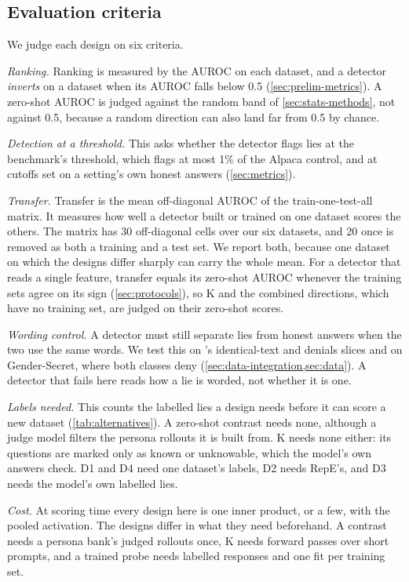 \subsection{Evaluation criteria}
\label{sec:criteria}

We judge each design on six criteria.

\emph{Ranking.} Ranking is measured by the AUROC on each dataset, and a detector \emph{inverts} on a
dataset when its AUROC falls below 0.5 (\cref{sec:prelim-metrics}). A zero-shot AUROC is judged
against the random band of \cref{sec:stats-methods}, not against 0.5, because a random direction
can also land far from 0.5 by chance.

\emph{Detection at a threshold.} This asks whether the detector flags lies at the benchmark's
threshold, which flags at most 1\% of the Alpaca control, and at cutoffs set on a setting's own
honest answers (\cref{sec:metrics}).

\emph{Transfer.} Transfer is the mean off-diagonal AUROC of the train-one-test-all matrix. It
measures how well a detector built or trained on one dataset scores the others. The matrix has 30
off-diagonal cells over our six datasets, and 20 once \hpkr{} is removed as both a training and a
test set. We report both, because one dataset on which the designs differ sharply can carry the whole
mean. For a detector that reads a single feature, transfer equals its zero-shot AUROC whenever the
training sets agree on its sign (\cref{sec:protocols}), so K and the combined directions, which have
no training set, are judged on their zero-shot scores.

\emph{Wording control.} A detector must still separate lies from honest answers when the two use
the same words. We test this on \hpkr's identical-text and denials slices and on Gender-Secret, where
both classes deny (\cref{sec:data-integration,sec:data}). A detector that fails here reads how a lie
is worded, not whether it is one.

\emph{Labels needed.} This counts the labelled lies a design needs before it can score a new dataset
(\cref{tab:alternatives}). A zero-shot contrast needs none, although a judge model filters the
persona rollouts it is built from. K needs none either: its questions are marked only as known or
unknowable, which the model's own answers check. D1 and D4 need one dataset's labels, D2 needs RepE's,
and D3 needs the model's own labelled lies.

\emph{Cost.} At scoring time every design here is one inner product, or a few, with the pooled
activation. The designs differ in what they need beforehand. A contrast needs a persona bank's judged
rollouts once, K needs  forward passes over short prompts, and a trained probe needs
labelled responses and one fit per training set.

